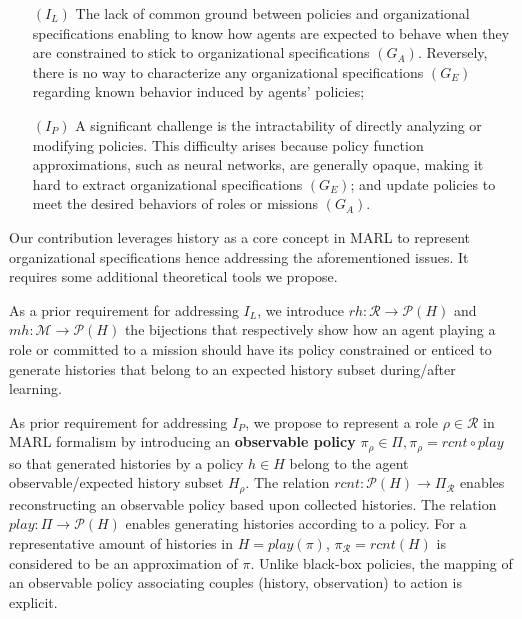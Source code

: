 \documentclass[runningheads]{llncs}
\newcounter{relation}
\begin{document}
\begin{itemize}[wide, labelsep = 1em]
    \item[$(I_L)$] The lack of common ground between policies and organizational specifications enabling to know how agents are expected to behave when they are constrained to stick to organizational specifications $(G_A)$. Reversely, there is no way to characterize any organizational specifications $(G_E)$ regarding known behavior induced by agents' policies;
    \item[$(I_P)$] A significant challenge is the intractability of directly analyzing or modifying policies. This difficulty arises because policy function approximations, such as neural networks, are generally opaque, making it hard to extract organizational specifications $(G_E)$; and update policies to meet the desired behaviors of roles or missions $(G_A)$.
\end{itemize}

Our contribution leverages history as a core concept in MARL to represent organizational specifications hence addressing the aforementioned issues. It requires some additional theoretical tools we propose.

As a prior requirement for addressing $I_L$, we introduce $rh: \mathcal{R} \rightarrow \mathcal{P}(H)$ and $mh: \mathcal{M} \rightarrow \mathcal{P}(H)$ the bijections that respectively show how an agent playing a role or committed to a mission should have its policy constrained or enticed to generate histories that belong to an expected history subset during/after learning.

As prior requirement for addressing $I_P$, we propose to represent a role $\rho \in \mathcal{R}$ in MARL formalism by introducing an \textbf{observable policy} $\pi_{\rho} \in \Pi, \pi_{\rho} = rcnt \circ play$ so that generated histories by a policy $h \in H$ belong to the agent observable/expected history subset $H_{\rho}$. The relation $rcnt: \mathcal{P}(H) \rightarrow \Pi_{\mathcal{R}}$ enables reconstructing an observable policy based upon collected histories. The relation $play: \Pi \rightarrow \mathcal{P}(H)$ enables generating histories according to a policy. For a representative amount of histories in $H = play(\pi)$, $\pi_{\mathcal{R}} = rcnt(H)$ is considered to be an approximation of $\pi$.
Unlike black-box policies, the mapping of an observable policy associating couples (history, observation) to action is explicit.
\end{document}
